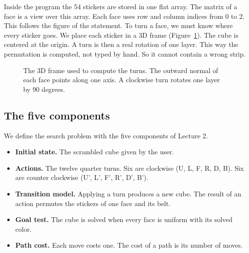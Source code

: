 \documentclass[11pt,a4paper]{article}
\begin{document}
Inside the program the 54 stickers are stored in one flat array. The matrix of a
face is a view over this array. Each face uses row and column indices from 0 to 2.
This follows the figure of the statement. To turn a face, we must know where every
sticker goes. We place each sticker in a 3D frame (Figure~\ref{fig:axes}). The
cube is centered at the origin. A turn is then a real rotation of one layer. This
way the permutation is computed, not typed by hand. So it cannot contain a wrong
strip.

\begin{figure}[H]
\centering
{}
\caption{The 3D frame used to compute the turns. The outward normal of each face
points along one axis. A clockwise turn rotates one layer by 90 degrees.}
\label{fig:axes}
\end{figure}

\subsection{The five components}

We define the search problem with the five components of Lecture 2.

\begin{itemize}
    \item \textbf{Initial state.} The scrambled cube given by the user.
    \item \textbf{Actions.} The twelve quarter turns. Six are clockwise (U, L, F,
          R, D, B). Six are counter clockwise (U', L', F', R', D', B').
    \item \textbf{Transition model.} Applying a turn produces a new cube. The
          result of an action permutes the stickers of one face and its belt.
    \item \textbf{Goal test.} The cube is solved when every face is uniform with
          its solved color.
    \item \textbf{Path cost.} Each move costs one. The cost of a path is its
          number of moves.
\end{itemize}
\end{document}
